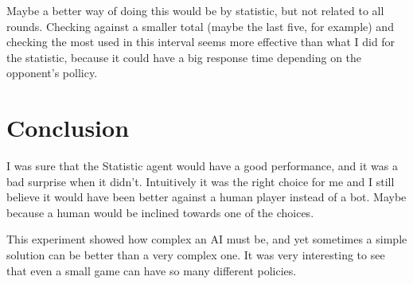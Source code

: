 \documentclass[12pt]{article}
\begin{document}
Maybe a better way of doing this would be by statistic, but not related to all rounds. Checking against a smaller total (maybe the last five, for example) and checking the most used in this interval seems more effective than what I did for the statistic, because it could have a big response time depending on the opponent's pollicy.

\section{Conclusion}

I was sure that the Statistic agent would have a good performance, and it was a bad surprise when it didn't. Intuitively it was the right choice for me and I still believe it would have been better against a human player instead of a bot. Maybe because a human would be inclined towards one of the choices.

This experiment showed how complex an AI must be, and yet sometimes a simple solution can be better than a very complex one. It was very interesting to see that even a small game can have so many different policies.
\end{document}
